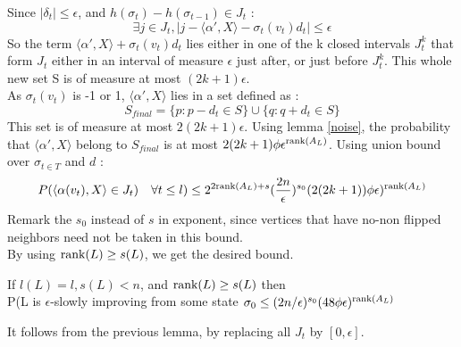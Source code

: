 Since  $|\delta_t| \leq \epsilon$, and $h(\sigma_t) - h(\sigma_{t-1}) \in J_t$ : 
\begin{equation*}
\exists j \in J_t, |j - \langle\alpha ', X \rangle -   \sigma_t(v_t)d_t| \leq \epsilon
\end{equation*}
So the term $\langle\alpha ', X \rangle +   \sigma_t(v_t)d_t$ lies either in one of the k closed intervals $J^k_t$ that form $J_t$ either in an interval of measure $\epsilon$ just after, or just before $J^k_t$. This whole new set S is of measure at most $(2k+ 1)\epsilon$. \\
As $\sigma_t(v_t)$ is -1 or 1, $\langle\alpha ', X \rangle$ lies in a set defined as :
\begin{equation*}
S_{final} = \{p : p - d_t \in S\} \cup \{q:  q + d_t \in S\}
\end{equation*}
This set is of measure at most $2(2k + 1) \epsilon$. Using lemma \ref{noise}, the probability that $\langle\alpha ', X \rangle$ belong to $S_{final}$ is at most $2(2k + 1)\phi\epsilon^{\text{rank}(A_L)}$. Using union bound over $\sigma_{t \in T}$ and $d$ :
\begin{equation*}
P(\langle \alpha(v_t), X \rangle \in J_t) \quad \forall t\leq l) \leq 2^{2\text{rank}(A_L) + s}(\frac{2n}{\epsilon})^{s_0}(2(2k+1))\phi\epsilon)^{\text{rank}(A_L)}
\end{equation*}
Remark the $s_0$ instead of $s$ in exponent, since vertices that have no-non flipped neighbors need not be taken in this bound. \\
By using  $\text{rank}(L) \geq s(L)$, we get the desired bound. \\

\begin{corollary}
\label{cor::boundN}
If $l(L) = l, s(L) < n$, and $\text{rank}(L) \geq s(L)$ then \\
P(L is $\epsilon$-slowly improving from some state $\sigma_0 \leq (2n/\epsilon)^{s_0}(48\phi\epsilon)^{\text{rank}(A_L)}$
\end{corollary}

It follows from the previous lemma, by replacing all $J_t$ by $[0, \epsilon]$.